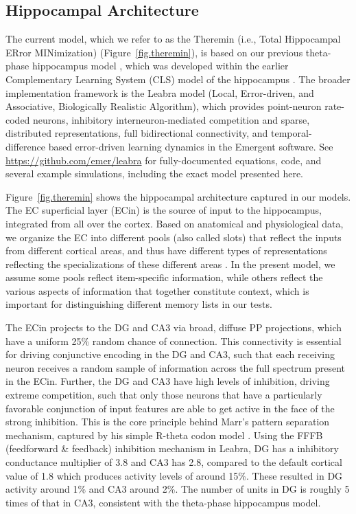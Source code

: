 \documentclass[11pt,twoside]{article}
\newif\myifpdf
\begin{document}
\subsection{Hippocampal Architecture}

The current model, which we refer to as the Theremin (i.e., Total Hippocampal ERror MINimization) (Figure~\ref{fig.theremin}), is based on our previous theta-phase hippocampus model \citep{KetzMorkondaOReilly13}, which was developed within the earlier Complementary Learning System (CLS) model of the hippocampus \citep{NormanOReilly03,OReillyRudy01}.  The broader implementation framework is the Leabra model (Local, Error-driven, and Associative, Biologically Realistic Algorithm), which provides point-neuron rate-coded neurons, inhibitory interneuron-mediated competition and sparse, distributed representations, full bidirectional connectivity, and temporal-difference based error-driven learning dynamics \citep{OReillyMunakata00,OReillyMunakataFrankEtAl12} in the Emergent software.  See \url{https://github.com/emer/leabra} for fully-documented equations, code, and several example simulations, including the exact model presented here.

Figure~\ref{fig.theremin} shows the hippocampal architecture captured in our models. The EC superficial layer (ECin) is the source of input to the hippocampus, integrated from all over the cortex.  Based on anatomical and physiological data, we organize the EC into different pools (also called slots) that reflect the inputs from different cortical areas, and thus have different types of representations reflecting the specializations of these different areas \citep{WitterDoanJacobsenEtAl17}.  In the present model, we assume some pools reflect item-specific information, while others reflect the various aspects of information that together constitute context, which is important for distinguishing different memory lists in our tests.

The ECin projects to the DG and CA3 via broad, diffuse PP projections, which have a uniform 25\% random chance of connection.  This connectivity is essential for driving conjunctive encoding in the DG and CA3, such that each receiving neuron receives a random sample of information across the full spectrum present in the ECin.  Further, the DG and CA3 have high levels of inhibition, driving extreme competition, such that only those neurons that have a particularly favorable conjunction of input features are able to get active in the face of the strong inhibition.  This is the core principle behind Marr's pattern separation mechanism, captured by his simple R-theta codon model \citep{Marr71}.  Using the FFFB (feedforward \& feedback) inhibition mechanism in Leabra, DG has a inhibitory conductance multiplier of 3.8 and CA3 has 2.8, compared to the default cortical value of 1.8 which produces activity levels of around 15\%.  These resulted in DG activity around 1\% and CA3 around 2\%.  The number of units in DG is roughly 5 times of that in CA3, consistent with the theta-phase hippocampus model.
\end{document}
